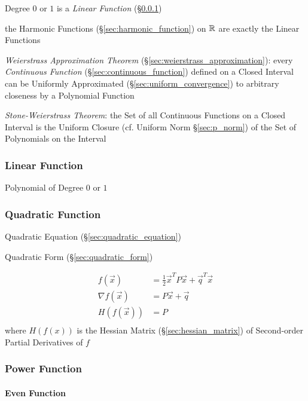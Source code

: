 Degree $0$ or $1$ is a \emph{Linear Function} (\S\ref{sec:linear_function})

the Harmonic Functions (\S\ref{sec:harmonic_function}) on $\mathbb{R}$ are
exactly the Linear Functions

\emph{Weierstrass Approximation Theorem}
(\S\ref{sec:weierstrass_approximation}): every \emph{Continuous Function}
(\S\ref{sec:continuous_function}) defined on a Closed Interval can be Uniformly
Approximated (\S\ref{sec:uniform_convergence}) to arbitrary closeness by a
Polynomial Function

\emph{Stone-Weierstrass Theorem}: the Set of all Continuous Functions on a
Closed Interval is the Uniform Closure (cf. Uniform Norm \S\ref{sec:p_norm}) of
the Set of Polynomials on the Interval



\subsubsection{Linear Function}\label{sec:linear_function}

Polynomial of Degree $0$ or $1$



\subsubsection{Quadratic Function}\label{sec:quadratic_function}

\fist Quadratic Equation (\S\ref{sec:quadratic_equation})

\fist Quadratic Form (\S\ref{sec:quadratic_form})

\begin{align*}
  f(\vec{x})        & = \frac{1}{2}\vec{x}^T P \vec{x} + \vec{q}^T\vec{x} \\
  \nabla f(\vec{x}) & = P\vec{x} + \vec{q} \\
  H(f(\vec{x}))     & = P \\
\end{align*}
where $H(f(x))$ is the Hessian Matrix (\S\ref{sec:hessian_matrix}) of
Second-order Partial Derivatives of $f$



\subsubsection{Power Function}\label{sec:power_function}


\paragraph{Even Function}\label{sec:even_function}\hfill

